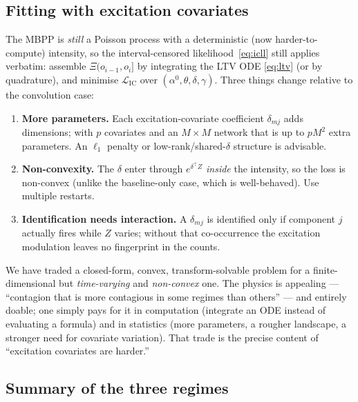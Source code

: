 \subsection{Fitting with excitation covariates}

The MBPP is \emph{still} a Poisson process with a deterministic (now
harder-to-compute) intensity, so the interval-censored likelihood~\eqref{eq:icll}
still applies verbatim: assemble $\Xi(o_{i-1},o_i]$ by integrating the LTV ODE
\eqref{eq:ltv} (or by quadrature), and minimise $\mathcal L_{\mathrm{IC}}$ over
$(\alpha^0,\theta,\delta,\gamma)$. Three things change relative to the convolution
case:
\begin{enumerate}[leftmargin=2.0em]
\item \textbf{More parameters.} Each excitation-covariate coefficient $\delta_{mj}$
adds dimensions; with $p$ covariates and an $M\times M$ network that is up to
$pM^2$ extra parameters. An $\ell_1$ penalty or low-rank/shared-$\delta$ structure
is advisable.
\item \textbf{Non-convexity.} The $\delta$ enter through $e^{\delta^\top Z}$
\emph{inside} the intensity, so the loss is non-convex (unlike the baseline-only
case, which is well-behaved). Use multiple restarts.
\item \textbf{Identification needs interaction.} A $\delta_{mj}$ is identified only
if component $j$ actually fires while $Z$ varies; without that co-occurrence the
excitation modulation leaves no fingerprint in the counts.
\end{enumerate}

\begin{intuition}
We have traded a closed-form, convex, transform-solvable problem for a
finite-dimensional but \emph{time-varying} and \emph{non-convex} one. The physics
is appealing --- ``contagion that is more contagious in some regimes than others''
--- and entirely doable; one simply pays for it in computation (integrate an ODE
instead of evaluating a formula) and in statistics (more parameters, a rougher
landscape, a stronger need for covariate variation). That trade is the precise
content of ``excitation covariates are harder.''
\end{intuition}

\subsection{Summary of the three regimes}

